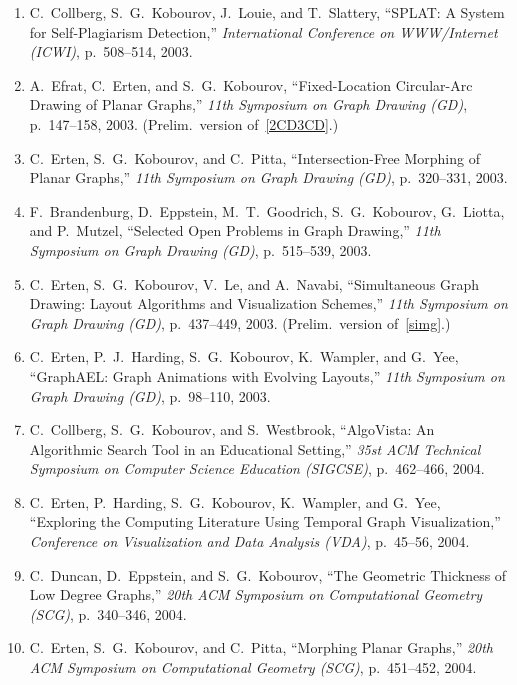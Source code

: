 \documentclass[10pt]{article}
\begin{document}
\begin{description}
\begin{enumerate}
\item 
C.~Collberg, S.~G.~Kobourov, J.~Louie, and T.~Slattery, ``SPLAT: A
System for Self-Plagiarism Detection,'' {\em International Conference on WWW/Internet (ICWI)}, p.~508--514,
2003.

\item 
A.~Efrat, C.~Erten, and S.~G.~Kobourov, ``Fixed-Location Circular-Arc
Drawing of Planar Graphs,'' {\em 11th Symposium on Graph Drawing
(GD)}, p.~147--158, 2003. (Prelim.~version of~\ref{2CD3CD}.)


\item 
C.~Erten, S.~G.~Kobourov, and C.~Pitta, ``Intersection-Free Morphing
of Planar Graphs,'' {\em 11th Symposium on Graph Drawing (GD)}, p.~320--331, 2003.

\item 
F.~Brandenburg, D.~Eppstein, M.~T.~Goodrich, S.~G.~Kobourov,
G.~Liotta, and P.~Mutzel, ``Selected Open Problems in Graph Drawing,'' {\em 11th
Symposium on Graph Drawing (GD)}, p.~515--539, 2003.

\item  
C.~Erten, S.~G.~Kobourov, V.~Le, and A.~Navabi, ``Simultaneous Graph
Drawing: Layout Algorithms and Visualization Schemes,'' {\em 11th
Symposium on Graph Drawing (GD)}, p.~437--449, 2003. (Prelim.~version of~\ref{simg}.)

\item 
C.~Erten, P.~J.~Harding, S.~G.~Kobourov, K.~Wampler, and G.~Yee,
``GraphAEL: Graph Animations with Evolving Layouts,'' {\em 11th
Symposium on Graph Drawing (GD)}, p.~98--110, 2003.

\item  C.~Collberg, S.~G.~Kobourov, and S.~Westbrook, ``AlgoVista: An Algorithmic Search Tool in an Educational Setting,'' {\em 35st ACM Technical Symposium on Computer Science Education (SIGCSE)}, p.~462--466, 2004.

\item C.~Erten, P.~Harding, S.~G.~Kobourov, K.~Wampler, and G.~Yee, ``Exploring the Computing Literature Using Temporal Graph Visualization,'' {\em Conference on Visualization and Data Analysis (VDA)}, p.~45--56, 2004.

\item C.~Duncan, D.~Eppstein, and S.~G.~Kobourov, ``The Geometric Thickness of Low Degree Graphs,'' {\em 20th ACM Symposium on Computational Geometry (SCG)}, p.~340--346, 2004.

\item C.~Erten, S.~G.~Kobourov, and C.~Pitta, ``Morphing Planar Graphs,'' {\em 20th ACM Symposium on Computational Geometry (SCG)},  p.~451--452, 2004.


\end{enumerate}
\end{description}
\end{document}
